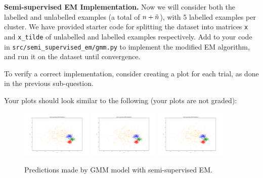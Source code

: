 \item{} \textbf{Semi-supervised EM Implementation.}
Now we will consider both the labelled and unlabelled examples (a total of ${n} + \tilde{{n}}$), with 5 labelled examples per cluster. We have provided starter code for splitting the dataset into matrices \texttt{x} and \texttt{x\_tilde} of unlabelled and labelled examples respectively. Add to your code in \texttt{src/semi\_supervised\_em/gmm.py} to implement the modified EM algorithm, and run it on the dataset until convergence.

To verify a correct implementation, consider creating a plot for each trial, as done in the previous sub-question.

Your plots should look similar to the following (your plots are not graded):

  \begin{figure}[H]
    \centering
    \includegraphics[width=0.3\textwidth]{semi_supervised_em/pred_ss_0.pdf}
    \includegraphics[width=0.3\textwidth]{semi_supervised_em/pred_ss_1.pdf}
    \includegraphics[width=0.3\textwidth]{semi_supervised_em/pred_ss_2.pdf}
    \caption{Predictions made by GMM model with semi-supervised EM.}
  \end{figure}
